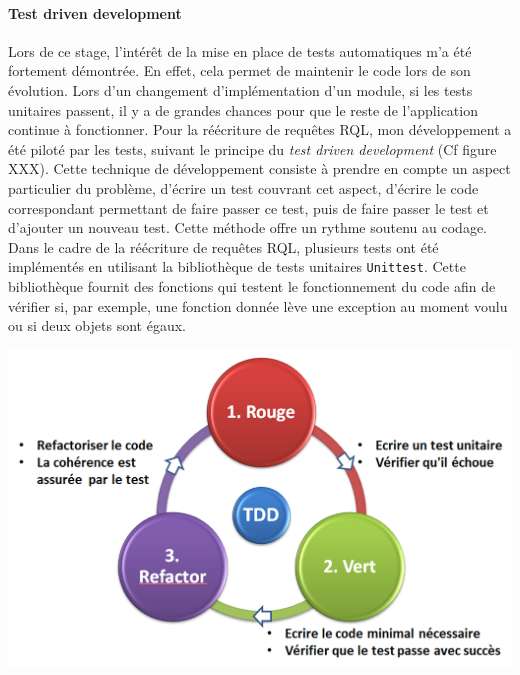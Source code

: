 \documentclass {report}
\begin{document}
\paragraph{Test driven development}
Lors de ce stage, l'intérêt de la mise en place de tests automatiques m'a été fortement démontrée. En effet, cela permet de maintenir le code lors de son évolution. Lors d’un changement d’implémentation d’un module, si les tests unitaires passent, il y a de grandes chances pour que le reste de l’application continue à fonctionner. Pour la réécriture de requêtes RQL, mon développement a été piloté par les tests, suivant le principe du \textit{test driven development} (Cf figure XXX). Cette technique de développement consiste à prendre en compte un aspect particulier du problème, d'écrire un test couvrant cet aspect, d'écrire le code correspondant permettant de faire passer ce test, puis de faire passer le test et d'ajouter un nouveau test. Cette méthode offre un rythme soutenu au codage. Dans le cadre de la réécriture de requêtes RQL, plusieurs tests ont été implémentés en utilisant la bibliothèque de tests unitaires \verb+Unittest+. Cette bibliothèque fournit des fonctions qui testent le fonctionnement du code afin de vérifier si, par exemple, une fonction donnée lève une exception au moment voulu ou si deux objets sont égaux. 

\begin{center}
\includegraphics[scale=0.3]{tdd.png}
\end{center}
\end{document}
